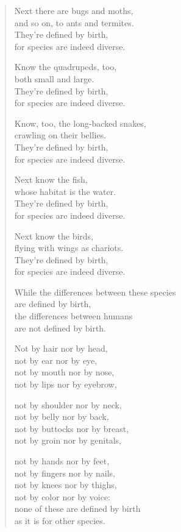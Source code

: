 \documentclass[12pt,openany]{book}%
\begin{document}
\begin{verse}
Next there are bugs and moths, \\
and so on, to ants and termites. \\
They’re defined by birth, \\
for species are indeed diverse. 

Know the quadrupeds, too, \\
both small and large. \\
They’re defined by birth, \\
for species are indeed diverse. 

Know, too, the long-backed snakes, \\
crawling on their bellies. \\
They’re defined by birth, \\
for species are indeed diverse. 

Next know the fish, \\
whose habitat is the water. \\
They’re defined by birth, \\
for species are indeed diverse. 

Next know the birds, \\
flying with wings as chariots. \\
They’re defined by birth, \\
for species are indeed diverse. 

While the differences between these species \\
are defined by birth, \\
the differences between humans \\
are not defined by birth. 

Not by hair nor by head, \\
not by ear nor by eye, \\
not by mouth nor by nose, \\
not by lips nor by eyebrow, 

not by shoulder nor by neck, \\
not by belly nor by back, \\
not by buttocks nor by breast, \\
not by groin nor by genitals, 

not by hands nor by feet, \\
not by fingers nor by nails, \\
not by knees nor by thighs, \\
not by color nor by voice: \\
none of these are defined by birth \\
as it is for other species. 


\end{verse}
\end{document}
